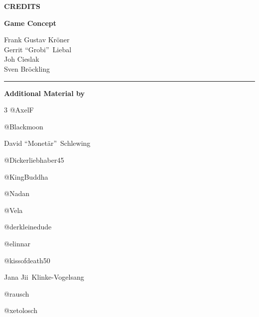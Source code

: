 \thispagestyle{empty}
\begin{center}
    \vspace*{0.14\textheight}
    {\titlefont\bfseries\fontsize{30}{36}\selectfont CREDITS\par}
    \vspace{0.65cm}
    \vspace{1.35cm}

    \begin{minipage}{0.58\textwidth}
        \centering
        {\titlefont\large\bfseries Game Concept\par}
        \vspace{0.25cm}
        Frank Gustav Kröner\\
        Gerrit \textquotedblleft Grobi\textquotedblright\ Liebal\\
        Joh Cieslak\\
        Sven Bröckling
    \end{minipage}
    \vspace{1.25cm}

    \rule{0.55\textwidth}{0.4pt}\par
    \vspace{0.55cm}
    {\titlefont\large\bfseries Additional Material by\par}
    \vspace{0.5cm}
\end{center}
\begin{multicols}{3}
    \centering
    @AxelF\par
    @Blackmoon\par
    David \textquotedblleft Monetär\textquotedblright\ Schlewing\par
    @Dickerliebhaber45\par
    @KingBuddha\par
    @Nadan\par
    @Vela\par
    @derkleinedude\par
    @elinnar\par
    @kissofdeath50\par
    Jana \glqq Jii\grqq\ Klinke-Vogelsang\par
    @rausch\par
    @xetolosch\par
\end{multicols}
\vfill
\clearpage

